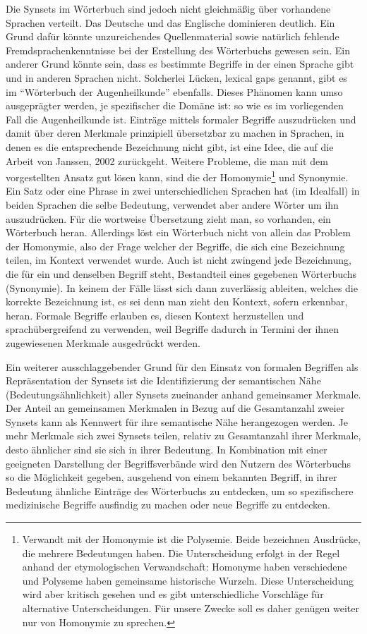 \documentclass[pagesize,paper=A4,DIV=calc,fontsize=12pt,draft=false]{scrreprt}
\begin{document}
Die Synsets im Wörterbuch sind jedoch nicht gleichmäßig über vorhandene Sprachen verteilt. 
Das Deutsche und das Englische dominieren deutlich. 
Ein Grund dafür könnte unzureichendes Quellenmaterial sowie natürlich fehlende Fremdsprachenkenntnisse bei der Erstellung des Wörterbuchs gewesen sein. 
Ein anderer Grund könnte sein, dass es bestimmte Begriffe in der einen Sprache gibt und in anderen Sprachen nicht. 
Solcherlei Lücken, lexical gaps genannt, gibt es im \enquote{Wörterbuch der Augenheilkunde} ebenfalls. 
Dieses Phänomen kann umso ausgeprägter werden, je spezifischer die Domäne ist: so wie es im vorliegenden Fall die Augenheilkunde ist. 
Einträge mittels formaler Begriffe auszudrücken und damit über deren Merkmale prinzipiell übersetzbar zu machen in Sprachen, in denen es die entsprechende Bezeichnung nicht gibt, ist eine Idee, die auf die Arbeit von Janssen, 2002 zurückgeht.  
Weitere Probleme, die man mit dem vorgestellten Ansatz gut lösen kann, sind die der Homonymie\footnote{Verwandt mit der Homonymie ist die Polysemie. Beide bezeichnen Ausdrücke, die mehrere Bedeutungen haben. Die Unterscheidung erfolgt in der Regel anhand der etymologischen Verwandschaft: Homonyme haben verschiedene und Polyseme haben gemeinsame historische Wurzeln. Diese Unterscheidung wird aber kritisch gesehen \parencite{bussmann2002} und es gibt unterschiedliche Vorschläge für alternative Unterscheidungen. Für unsere Zwecke soll es daher genügen weiter nur von Homonymie zu sprechen.} und Synonymie. 
Ein Satz oder eine Phrase in zwei unterschiedlichen Sprachen hat (im Idealfall) in beiden Sprachen die selbe Bedeutung, verwendet aber andere Wörter um ihn auszudrücken. 
Für die wortweise Übersetzung zieht man, so vorhanden, ein Wörterbuch heran. 
Allerdings löst ein Wörterbuch nicht von allein das Problem der Homonymie, also der Frage welcher der Begriffe, die sich eine Bezeichnung teilen, im Kontext verwendet wurde. 
Auch ist nicht zwingend jede Bezeichnung, die für ein und denselben Begriff steht, Bestandteil eines gegebenen Wörterbuchs (Synonymie). 
In keinem der Fälle lässt sich dann zuverlässig ableiten, welches die korrekte Bezeichnung ist, es sei denn man zieht den Kontext, sofern erkennbar, heran. 
Formale Begriffe erlauben es, diesen Kontext herzustellen und sprachübergreifend zu verwenden, weil Begriffe dadurch in Termini der ihnen zugewiesenen Merkmale ausgedrückt werden. 

Ein weiterer ausschlaggebender Grund für den Einsatz von formalen Begriffen als Repräsentation der Synsets ist die Identifizierung der semantischen Nähe (Bedeutungsähnlichkeit) aller Synsets zueinander anhand gemeinsamer Merkmale. 
Der Anteil an gemeinsamen Merkmalen in Bezug auf die Gesamtanzahl zweier Synsets kann als Kennwert für ihre semantische Nähe herangezogen werden. 
Je mehr Merkmale sich zwei Synsets teilen, relativ zu Gesamtanzahl ihrer Merkmale, desto ähnlicher sind sie sich in ihrer Bedeutung. 
In Kombination mit einer geeigneten Darstellung der Begriffsverbände wird den Nutzern des Wörterbuchs so die Möglichkeit gegeben, ausgehend von einem bekannten Begriff, in ihrer Bedeutung ähnliche Einträge des Wörterbuchs zu entdecken, um so spezifischere medizinische Begriffe ausfindig zu machen oder neue Begriffe zu entdecken. 
\end{document}
